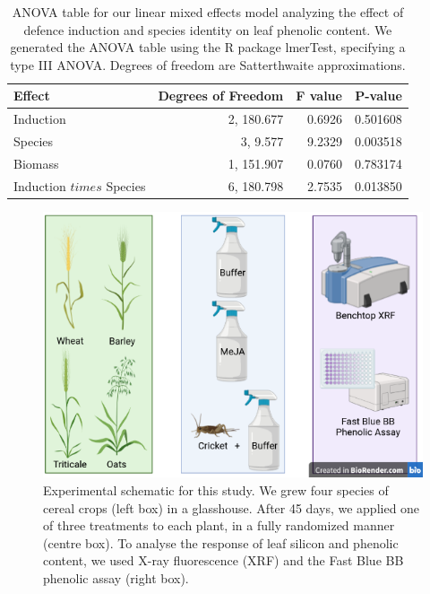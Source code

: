 \documentclass[12pt, letterpaper, ]{report}
\begin{document}
\begin{table}[ht]
        \centering
        \caption{ANOVA table for our linear mixed effects model analyzing the effect of defence induction and species identity on leaf phenolic content. We generated the ANOVA table using the R package lmerTest, specifying a type III ANOVA. Degrees of freedom are Satterthwaite approximations.}
        \label{Tab:phe_params}
        \begin{tabular}{lrrr}
               \hline
                \textbf{Effect} & \textbf{Degrees of Freedom} & \textbf{F value} &    \textbf{P-value} \\ 
                \hline   
                Induction         &     2, 180.677 & 0.6926 & 0.501608 \\
                Species           &     3,   9.577 & 9.2329 & 0.003518 \\
                Biomass          &     1, 151.907 & 0.0760 & 0.783174 \\
                Induction $times$ Species &     6, 180.798 & 2.7535 & 0.013850 \\
                \hline
        \end{tabular}
\end{table}



\begin{figure}[ht]
        \includegraphics[width = \textwidth]{images/Induction_schematic.png}
        \centering
        \caption{Experimental schematic for this study. We grew four species of cereal crops (left box) in a glasshouse. After 45 days, we applied one of three treatments to each plant, in a fully randomized manner (centre box). To analyse the response of leaf silicon and phenolic content, we used X-ray fluorescence (XRF) and the Fast Blue BB phenolic assay (right box).}
        \label{Fig:exp_design}
\end{figure}
\end{document}
